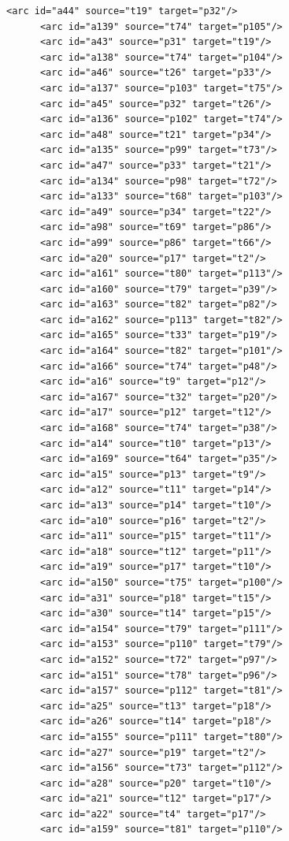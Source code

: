 \begin{multicols}{2}
\begin{lstlisting}[basicstyle=\ttfamily\tiny]
      <arc id="a44" source="t19" target="p32"/>
      <arc id="a139" source="t74" target="p105"/>
      <arc id="a43" source="p31" target="t19"/>
      <arc id="a138" source="t74" target="p104"/>
      <arc id="a46" source="t26" target="p33"/>
      <arc id="a137" source="p103" target="t75"/>
      <arc id="a45" source="p32" target="t26"/>
      <arc id="a136" source="p102" target="t74"/>
      <arc id="a48" source="t21" target="p34"/>
      <arc id="a135" source="p99" target="t73"/>
      <arc id="a47" source="p33" target="t21"/>
      <arc id="a134" source="p98" target="t72"/>
      <arc id="a133" source="t68" target="p103"/>
      <arc id="a49" source="p34" target="t22"/>
      <arc id="a98" source="t69" target="p86"/>
      <arc id="a99" source="p86" target="t66"/>
      <arc id="a20" source="p17" target="t2"/>
      <arc id="a161" source="t80" target="p113"/>
      <arc id="a160" source="t79" target="p39"/>
      <arc id="a163" source="t82" target="p82"/>
      <arc id="a162" source="p113" target="t82"/>
      <arc id="a165" source="t33" target="p19"/>
      <arc id="a164" source="t82" target="p101"/>
      <arc id="a166" source="t74" target="p48"/>
      <arc id="a16" source="t9" target="p12"/>
      <arc id="a167" source="t32" target="p20"/>
      <arc id="a17" source="p12" target="t12"/>
      <arc id="a168" source="t74" target="p38"/>
      <arc id="a14" source="t10" target="p13"/>
      <arc id="a169" source="t64" target="p35"/>
      <arc id="a15" source="p13" target="t9"/>
      <arc id="a12" source="t11" target="p14"/>
      <arc id="a13" source="p14" target="t10"/>
      <arc id="a10" source="p16" target="t2"/>
      <arc id="a11" source="p15" target="t11"/>
      <arc id="a18" source="t12" target="p11"/>
      <arc id="a19" source="p17" target="t10"/>
      <arc id="a150" source="t75" target="p100"/>
      <arc id="a31" source="p18" target="t15"/>
      <arc id="a30" source="t14" target="p15"/>
      <arc id="a154" source="t79" target="p111"/>
      <arc id="a153" source="p110" target="t79"/>
      <arc id="a152" source="t72" target="p97"/>
      <arc id="a151" source="t78" target="p96"/>
      <arc id="a157" source="p112" target="t81"/>
      <arc id="a25" source="t13" target="p18"/>
      <arc id="a26" source="t14" target="p18"/>
      <arc id="a155" source="p111" target="t80"/>
      <arc id="a27" source="p19" target="t2"/>
      <arc id="a156" source="t73" target="p112"/>
      <arc id="a28" source="p20" target="t10"/>
      <arc id="a21" source="t12" target="p17"/>
      <arc id="a22" source="t4" target="p17"/>
      <arc id="a159" source="t81" target="p110"/>

\end{lstlisting}
\end{multicols}
